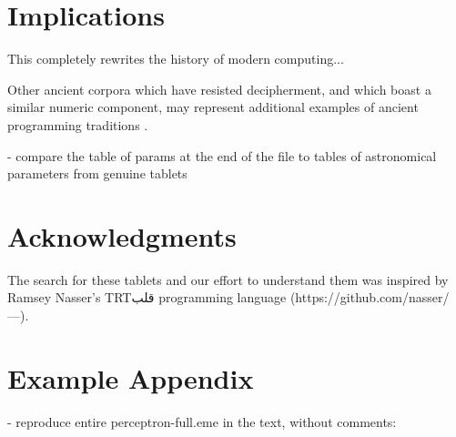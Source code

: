 \documentclass[11pt]{article}
\newcommand{\textarabic}[1]     %
    {\bgroup\textdir TRT\arabicfont #1\egroup}
\begin{document}
\section{Implications}
This completely rewrites the history of modern computing... 

Other ancient corpora which have resisted decipherment, and which boast a similar numeric component, may represent additional examples of ancient programming traditions \cite{kelley2022}.

- compare the table of params at the end of the file to tables of astronomical parameters from genuine tablets


\section*{Acknowledgments}
The search for these tablets and our effort to understand them was inspired by Ramsey Nasser's \textarabic{قلب} programming language (https://github.com/nasser/---).



\appendix

\section{Example Appendix}
\label{sec:appendix}

- reproduce entire perceptron-full.eme in the text, without comments:

\onecolumn
\tiny
\noindent

\normalsize
\end{document}
